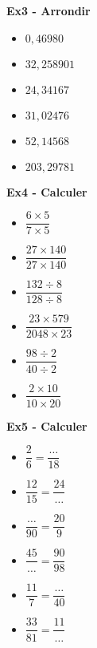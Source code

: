 \textbf{Ex3 - Arrondir}

\begin{multicols}{3}
\begin{itemize}[label={$\bullet$}]
  \item $0,46980$ \dotfill \\
  \item $32,258901$ \dotfill \\
  \item $24,34167$ \dotfill \\
  \item $31,02476$ \dotfill \\
  \item $52,14568$ \dotfill \\
  \item $203,29781$ \dotfill \\
\end{itemize}
\end{multicols}

\textbf{Ex4 - Calculer}

\begin{multicols}{3}
\begin{itemize}[label={$\bullet$}]
  \item $\dfrac{6 \times 5}{7 \times 5}$ \dotfill \\
  \item $\dfrac{27 \times 140}{27 \times  140}$ \dotfill \\
  \item $\dfrac{132 \div 8}{128 \div 8}$ \dotfill \\
  \item $\dfrac{23 \times 579}{2048 \times 23}$ \dotfill \\
  \item $\dfrac{98 \div 2}{40 \div 2}$ \dotfill \\
  \item $\dfrac{2 \times 10}{10 \times  20}$ \dotfill \\
\end{itemize}
\end{multicols}

\textbf{Ex5 - Calculer}

\begin{multicols}{3}
\begin{itemize}[label={$\bullet$}]
  \item $\dfrac{2}{6}= \dfrac{\ldots}{18}$ \\
  \item $\dfrac{12}{15}= \dfrac{24}{\ldots}$ \\
  \item $\dfrac{\ldots}{90}= \dfrac{20}{9}$ \\
  \item $\dfrac{45}{\ldots}= \dfrac{90}{98}$ \\
  \item $\dfrac{11}{7}= \dfrac{\ldots}{40}$ \\
  \item $\dfrac{33}{81}= \dfrac{11}{\ldots}$\\
\end{itemize}
\end{multicols}



